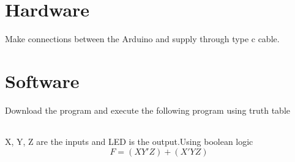 \documentclass{article}
\begin{document}
\begin{multicols}{2}
    \label{table1}

\section{Hardware}

\textbf{} Make connections between the Arduino and supply through type c cable.

\section{Software}

\textbf{} Download the program and execute the following program using truth table

\vspace{10mm}

\vspace{10mm}
    \centering
    \begin{tabular}{ |c |c |c |c| c|}

\hline
 \hline
 \end{tabular}
 \vspace{3mm}
 
    \label{table1}


X, Y, Z are the
inputs and LED is the output.Using boolean
logic
\begin{equation}
F=(XY'Z)+(X'YZ)
\end{equation}
\end{multicols}{}
\end{document}
